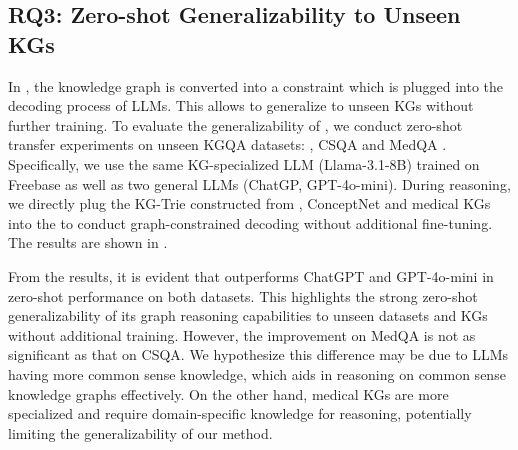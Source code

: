 \subsection{RQ3: Zero-shot Generalizability to Unseen KGs}\label{sec:transferability}
In \ourmethod, the knowledge graph is converted into a constraint which is plugged into the decoding process of LLMs. This allows \ourmethod to generalize to unseen KGs without further training. To evaluate the generalizability of \ourmethod, we conduct zero-shot transfer experiments on  unseen KGQA datasets: , CSQA \citep{talmor2019commonsenseqa} and MedQA \citep{jin2021disease}. Specifically, we use the same KG-specialized LLM (Llama-3.1-8B) trained on Freebase as well as two general LLMs (ChatGP, GPT-4o-mini). During reasoning, we directly plug the KG-Trie constructed from , ConceptNet and medical KGs into the \ourmethod to conduct graph-constrained decoding without additional fine-tuning. The results are shown in . 


From the results, it is evident that \ourmethod outperforms ChatGPT and GPT-4o-mini in zero-shot performance on both datasets.  This highlights the strong zero-shot generalizability of its graph reasoning capabilities to unseen datasets and KGs without additional training. However, the improvement on MedQA is not as significant as that on CSQA. We hypothesize this difference may be due to LLMs having more common sense knowledge, which aids in reasoning on common sense knowledge graphs effectively. On the other hand, medical KGs are more specialized and require domain-specific knowledge for reasoning, potentially limiting the generalizability of our method.
